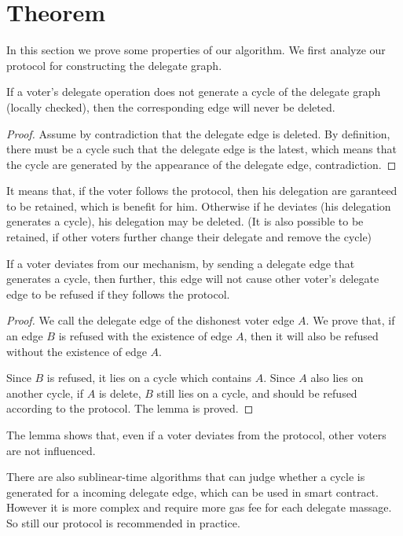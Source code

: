 \section{Theorem}
In this section we prove some properties of our algorithm. We first analyze our protocol for constructing the delegate graph.
\begin{lemma}
   If a voter's delegate operation does not generate a cycle of the delegate graph (locally checked), then the corresponding edge will never be deleted. 
\end{lemma}
\begin{proof}
	Assume by contradiction that the delegate edge is deleted. By definition, there must be a cycle such that the delegate edge is the latest, which means that the cycle are generated by the appearance of the delegate edge, contradiction.
\end{proof}
It means that, if the voter follows the protocol, then his delegation are garanteed to be retained, which is benefit for him. Otherwise if he deviates (his delegation generates a cycle), his delegation may be deleted. (It is also possible to be retained, if other voters further change their delegate and remove the cycle)
\begin{lemma}
	If a voter deviates from our mechanism, by sending a delegate edge that generates a cycle, then further, this edge will not cause other voter's delegate edge to be refused if they follows the protocol.
\end{lemma}
\begin{proof}
	We call the delegate edge of the dishonest voter edge $A$. We prove that, if an edge $B$ is refused with the existence of edge $A$, then it will also be refused without the existence of edge $A$.
	
	Since $B$ is refused, it lies on a cycle which contains $A$. Since $A$ also lies on another cycle, if $A$ is delete, $B$ still lies on a cycle, and should be refused according to the protocol. The lemma is proved.
\end{proof}
The lemma shows that, even if a voter deviates from the protocol, other voters are not influenced. 

There are also sublinear-time algorithms that can judge whether a cycle is generated for a incoming delegate edge, which can be used in smart contract. However it is more complex and require more gas fee for each delegate massage. So still our protocol is recommended in practice. 

